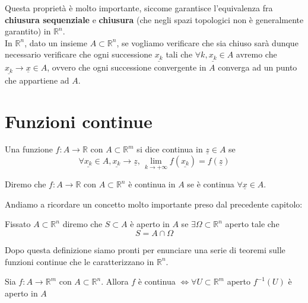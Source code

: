 \noindent Questa proprietà è molto importante, siccome garantisce l'equivalenza fra \textbf{chiusura sequenziale} e \textbf{chiusura} (che negli spazi topologici non è generalmente garantito) in $\mathbb{R}^n$. \\
In $\mathbb{R}^n$, dato un insieme $A \subset \mathbb{R}^n$, se vogliamo verificare che sia chiuso sarà dunque necessario verificare che ogni successione $\underline{x_k}$ tali che $\forall k, \underline{x_k} \in A$ avremo che $\underline{x_k} \to \underline{x} \in A$, ovvero che ogni successione convergente in $A$ converga ad un punto che appartiene ad $A$.

%
%
%
\vspace{0.5cm}
\section{Funzioni continue}

\begin{definition}[\textcolor{blue}{funzioni continue}]
Una funzione $f: A \to \mathbb{R}$ con $A \subset \mathbb{R}^m$ si dice continua in $\underline{z} \in A$ se $$\forall \underline{x_k} \in A, \underline{x_k} \to \underline{z}, \, \lim\limits_{k \to +\infty} f(\underline{x_k}) = f(\underline{z})$$
\end{definition}

\begin{remark}
Diremo che $f: A \to \mathbb{R}$ con $A \subset \mathbb{R}^n$ è continua in $A$ se è continua $\forall \underline{x} \in A$.
\end{remark}

\noindent Andiamo a ricordare un concetto molto importante preso dal precedente capitolo:

\vspace{0.5cm}
\begin{definition}[\textcolor{blue}{apertura relativa}]
Fissato $A \subset \mathbb{R}^n$ diremo che $S \subset A$ è aperto in $A$ se $\exists \Omega \subset \mathbb{R}^n$ aperto tale che $$S = A \cap \Omega$$
\end{definition}
Dopo questa definizione siamo pronti per enunciare una serie di teoremi sulle funzioni continue che le caratterizzano in $\mathbb{R}^n$.

\vspace{0.5cm}
\begin{theorem}[C1]
Sia $f: A \to \mathbb{R}^m$ con $A \subset \mathbb{R}^n$. Allora $f$ è continua $\iff \forall U \subset \mathbb{R}^m$ aperto $f^{-1}(U)$ è aperto in $A$
\label{thm:theo_c1}
\end{theorem}

